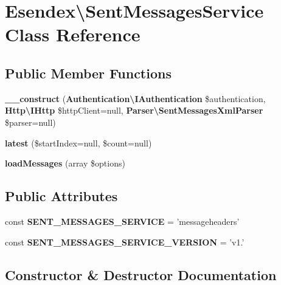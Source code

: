 \section{Esendex\textbackslash{}Sent\-Messages\-Service Class Reference}
\label{class_esendex_1_1_sent_messages_service}
\subsection*{Public Member Functions}
\begin{DoxyCompactItemize}
\item 
{\bf \-\_\-\-\_\-construct} ({\bf Authentication\textbackslash{}\-I\-Authentication} \$authentication, {\bf Http\textbackslash{}\-I\-Http} \$http\-Client=null, {\bf Parser\textbackslash{}\-Sent\-Messages\-Xml\-Parser} \$parser=null)
\item 
{\bf latest} (\$start\-Index=null, \$count=null)
\item 
{\bf load\-Messages} (array \$options)
\end{DoxyCompactItemize}
\subsection*{Public Attributes}
\begin{DoxyCompactItemize}
\item 
const {\bfseries S\-E\-N\-T\-\_\-\-M\-E\-S\-S\-A\-G\-E\-S\-\_\-\-S\-E\-R\-V\-I\-C\-E} = 'messageheaders'\label{class_esendex_1_1_sent_messages_service_a7aa163151422a38bc6583aa47436438c}

\item 
const {\bfseries S\-E\-N\-T\-\_\-\-M\-E\-S\-S\-A\-G\-E\-S\-\_\-\-S\-E\-R\-V\-I\-C\-E\-\_\-\-V\-E\-R\-S\-I\-O\-N} = 'v1.'\label{class_esendex_1_1_sent_messages_service_a8d9572bae934c61dd7192cc76e251041}

\end{DoxyCompactItemize}


\subsection{Constructor \& Destructor Documentation}
